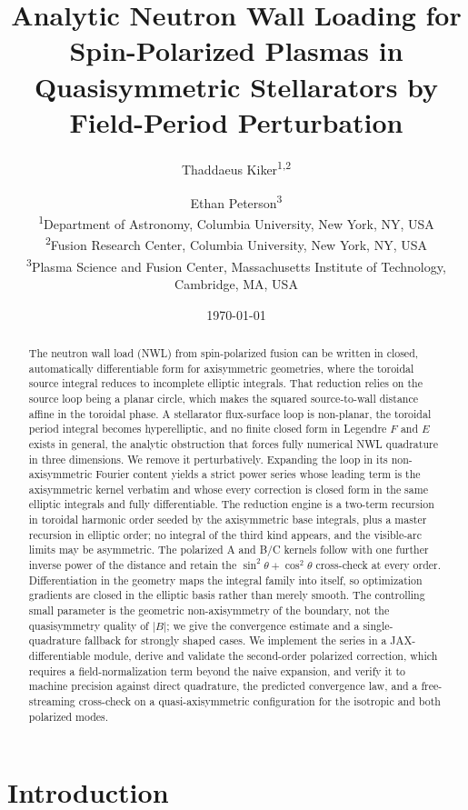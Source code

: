 \documentclass[11pt]{article}
\title{\bfseries Analytic Neutron Wall Loading for Spin-Polarized Plasmas in Quasisymmetric Stellarators by Field-Period Perturbation}
\author{
Thaddaeus Kiker\textsuperscript{1,2}
\and
Ethan Peterson\textsuperscript{3}
\\[4pt]
\small \textsuperscript{1}Department of Astronomy, Columbia University, New York, NY, USA\\
\small \textsuperscript{2}Fusion Research Center, Columbia University, New York, NY, USA\\
\small \textsuperscript{3}Plasma Science and Fusion Center, Massachusetts Institute of Technology, Cambridge, MA, USA
}
\date{\today}
\begin{document}
\maketitle

\begin{abstract}
\noindent
The neutron wall load (NWL) from spin-polarized fusion can be written in closed, automatically differentiable form for axisymmetric geometries, where the toroidal source integral reduces to incomplete elliptic integrals. That reduction relies on the source loop being a planar circle, which makes the squared source-to-wall distance affine in the toroidal phase. A stellarator flux-surface loop is non-planar, the toroidal period integral becomes hyperelliptic, and no finite closed form in Legendre $F$ and $E$ exists in general, the analytic obstruction that forces fully numerical NWL quadrature in three dimensions. We remove it perturbatively. Expanding the loop in its non-axisymmetric Fourier content yields a strict power series whose leading term is the axisymmetric kernel verbatim and whose every correction is closed form in the same elliptic integrals and fully differentiable. The reduction engine is a two-term recursion in toroidal harmonic order seeded by the axisymmetric base integrals, plus a master recursion in elliptic order; no integral of the third kind appears, and the visible-arc limits may be asymmetric. The polarized A and B/C kernels follow with one further inverse power of the distance and retain the $\sin^2\theta+\cos^2\theta$ cross-check at every order. Differentiation in the geometry maps the integral family into itself, so optimization gradients are closed in the elliptic basis rather than merely smooth. The controlling small parameter is the geometric non-axisymmetry of the boundary, not the quasisymmetry quality of $|B|$; we give the convergence estimate and a single-quadrature fallback for strongly shaped cases. We implement the series in a JAX-differentiable module, derive and validate the second-order polarized correction, which requires a field-normalization term beyond the naive expansion, and verify it to machine precision against direct quadrature, the predicted convergence law, and a free-streaming cross-check on a quasi-axisymmetric configuration for the isotropic and both polarized modes.
\end{abstract}

\section{Introduction}
\end{document}
